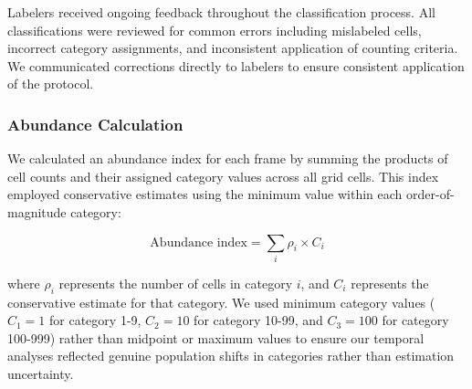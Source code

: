 Labelers received ongoing feedback throughout the classification process. All classifications were reviewed for common errors including mislabeled cells, incorrect category assignments, and inconsistent application of counting criteria. We communicated corrections directly to labelers to ensure consistent application of the protocol.

\subsubsection{Abundance Calculation}

We calculated an abundance index for each frame by summing the products of cell counts and their assigned category values across all grid cells. This index employed conservative estimates using the minimum value within each order-of-magnitude category:

\begin{equation}
\text{Abundance index} = \sum_{i} \rho_i \times C_i
\end{equation}

where $\rho_i$ represents the number of cells in category $i$, and $C_i$ represents the conservative estimate for that category. We used minimum category values ($C_1 = 1$ for category 1-9, $C_2 = 10$ for category 10-99, and $C_3 = 100$ for category 100-999) rather than midpoint or maximum values to ensure our temporal analyses reflected genuine population shifts in categories rather than estimation uncertainty.